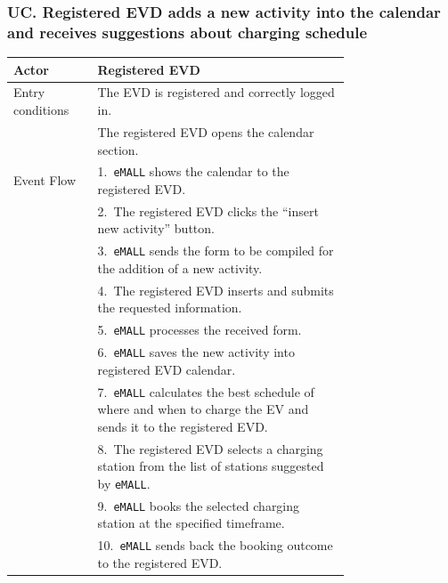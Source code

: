 \subsubsection*{UC\cuc . Registered EVD adds a new activity into the calendar and receives suggestions about charging schedule}
\begin{center}
    \begin{longtable}{lp{0.75\linewidth}}
        \hline
        Actor            & Registered EVD                                                                                                       \\
        \hline
        Entry conditions & The EVD is registered and correctly logged in.                                                                       \\
        & The registered EVD opens the calendar section.                                                                       \\
        \hline
        Event Flow       & 1.\ \verb|eMALL| shows the calendar to the registered EVD.                                                           \\
        & 2.\ The registered EVD clicks the ``insert new activity'' button.                                                    \\
        & 3.\ \verb|eMALL| sends the form to be compiled for the addition of a new activity.                                   \\
        & 4.\ The registered EVD inserts and submits the requested information.                                                \\
        & 5.\ \verb|eMALL| processes the received form.                                                                        \\
        & 6.\ \verb|eMALL| saves the new activity into registered EVD calendar.                                                \\
        & 7.\ \verb|eMALL| calculates the best schedule of where and when to charge the EV and sends it to the registered EVD. \\
        & 8.\ The registered EVD selects a charging station from the list of stations suggested by \verb|eMALL|.               \\
        & 9.\ \verb|eMALL| books the selected charging station at the specified timeframe.                                     \\
        & 10.\ \verb|eMALL| sends back the booking outcome to the registered EVD.                                              \\

\end{longtable}
\end{center}
